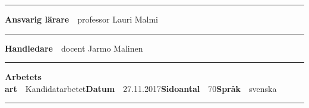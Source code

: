 \begin{spacing}{.88}
{\vspace{-2.4mm}\rule{\textwidth}{.75pt}

{\fontsize{10.5pt}{10.5pt}\bfseries\sffamily\lsstyle Ansvarig lärare}~~{\small professor Lauri Malmi}

\vspace{-2.4mm}\rule{\textwidth}{.75pt}

{\fontsize{10.5pt}{10.5pt}\bfseries\sffamily\lsstyle Handledare}~~{\small docent Jarmo Malinen}

\vspace{-2.4mm}\rule{\textwidth}{.75pt}

{\fontsize{10.5pt}{10.5pt}\bfseries\sffamily\lsstyle Arbetets art}~~{\small Kandidatarbetet}\hfill{\fontsize{10.5pt}{10.5pt}\bfseries\sffamily\lsstyle Datum}~~{\small 27.11.2017}\hfill{\fontsize{10.5pt}{10.5pt}\bfseries\sffamily\lsstyle Sidoantal}~~{\small 70}\hfill{\fontsize{10.5pt}{10.5pt}\bfseries\sffamily\lsstyle Språk}~~{\small svenska}

\vspace{-2.4mm}\rule{\textwidth}{.75pt}

\vspace{6mm}

} %
\end{spacing}

